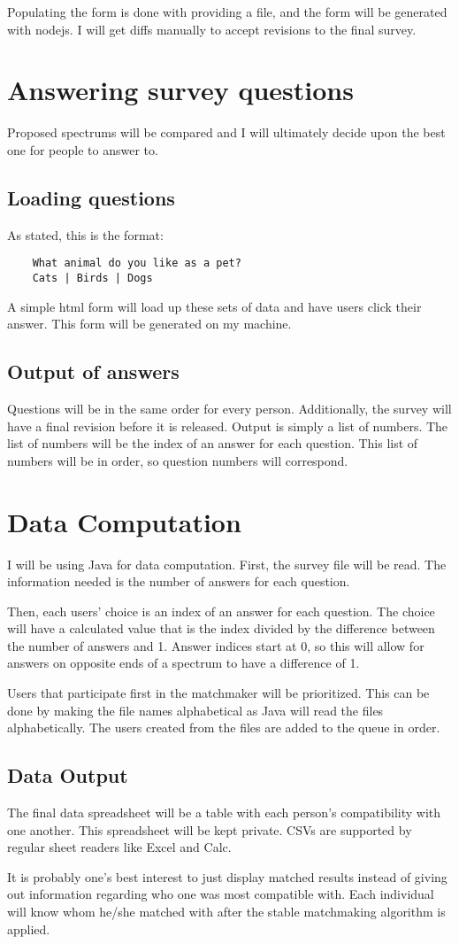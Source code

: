 \documentclass[12pt]{article}
\begin{document}
Populating the form is done with providing a file, and the form will be
generated with nodejs. I will get diffs manually to accept revisions to the
final survey.

\section{Answering survey questions}
Proposed spectrums will be compared and I will ultimately decide upon the best
one for people to answer to.

\subsection{Loading questions}
As stated, this is the format:
\begin{verbatim}
    What animal do you like as a pet?
    Cats | Birds | Dogs
\end{verbatim}

A simple html form will load up these sets of data and have users click their
answer. This form will be generated on my machine.

\subsection{Output of answers}
Questions will be in the same order for every person. Additionally, the survey
will have a final revision before it is released. Output is simply a list of
numbers. The list of numbers will be the index of an answer for each question.
This list of numbers will be in order, so question numbers will correspond.

\section{Data Computation}
I will be using Java for data computation.
First, the survey file will be read. The information needed is the number of
answers for each question.

Then, each users' choice is an index of an answer for each question. The choice
will have a calculated value that is the index divided by the difference between
the number of answers and 1. Answer indices start at 0, so this will allow for
answers on opposite ends of a spectrum to have a difference of 1.

Users that participate first in the matchmaker will be prioritized. This can be
done by making the file names alphabetical as Java will read the files
alphabetically. The users created from the files are added to the queue in
order.

\subsection{Data Output}
The final data spreadsheet will be a table with each person's compatibility
with one another. This spreadsheet will be kept private. CSVs are supported by
regular sheet readers like Excel and Calc.

It is probably one's best interest to just display matched results instead of
giving out information regarding who one was most compatible with. Each
individual will know whom he/she matched with after the stable matchmaking
algorithm is applied.
\end{document}
